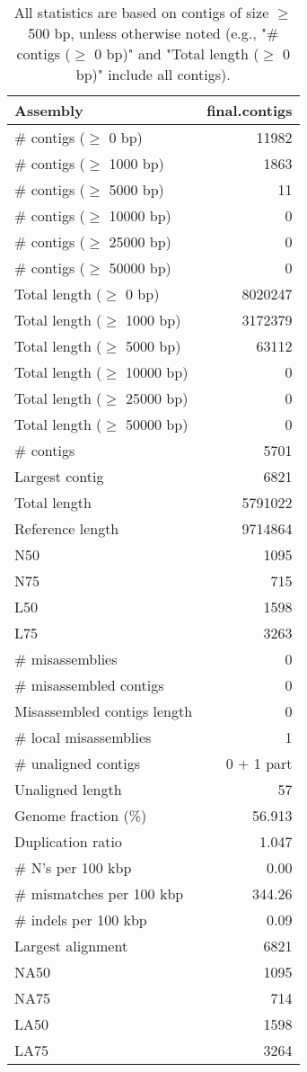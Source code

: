 \documentclass[12pt,a4paper]{article}
\begin{document}
\begin{table}[ht]
\begin{center}
\caption{All statistics are based on contigs of size $\geq$ 500 bp, unless otherwise noted (e.g., "\# contigs ($\geq$ 0 bp)" and "Total length ($\geq$ 0 bp)" include all contigs).}
\begin{tabular}{|l*{1}{|r}|}
\hline
Assembly & final.contigs \\ \hline
\# contigs ($\geq$ 0 bp) & 11982 \\ \hline
\# contigs ($\geq$ 1000 bp) & 1863 \\ \hline
\# contigs ($\geq$ 5000 bp) & 11 \\ \hline
\# contigs ($\geq$ 10000 bp) & 0 \\ \hline
\# contigs ($\geq$ 25000 bp) & 0 \\ \hline
\# contigs ($\geq$ 50000 bp) & 0 \\ \hline
Total length ($\geq$ 0 bp) & 8020247 \\ \hline
Total length ($\geq$ 1000 bp) & 3172379 \\ \hline
Total length ($\geq$ 5000 bp) & 63112 \\ \hline
Total length ($\geq$ 10000 bp) & 0 \\ \hline
Total length ($\geq$ 25000 bp) & 0 \\ \hline
Total length ($\geq$ 50000 bp) & 0 \\ \hline
\# contigs & 5701 \\ \hline
Largest contig & 6821 \\ \hline
Total length & 5791022 \\ \hline
Reference length & 9714864 \\ \hline
N50 & 1095 \\ \hline
N75 & 715 \\ \hline
L50 & 1598 \\ \hline
L75 & 3263 \\ \hline
\# misassemblies & 0 \\ \hline
\# misassembled contigs & 0 \\ \hline
Misassembled contigs length & 0 \\ \hline
\# local misassemblies & 1 \\ \hline
\# unaligned contigs & 0 + 1 part \\ \hline
Unaligned length & 57 \\ \hline
Genome fraction (\%) & 56.913 \\ \hline
Duplication ratio & 1.047 \\ \hline
\# N's per 100 kbp & 0.00 \\ \hline
\# mismatches per 100 kbp & 344.26 \\ \hline
\# indels per 100 kbp & 0.09 \\ \hline
Largest alignment & 6821 \\ \hline
NA50 & 1095 \\ \hline
NA75 & 714 \\ \hline
LA50 & 1598 \\ \hline
LA75 & 3264 \\ \hline
\end{tabular}
\end{center}
\end{table}
\end{document}
